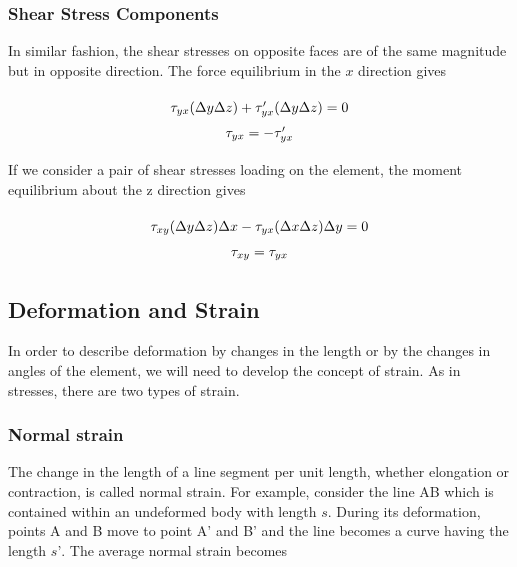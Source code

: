 \documentclass[
10pt,
a4paper,
openany,
svgnames,
]{book}
\begin{document}
\subsubsection{Shear Stress Components}

In similar fashion, the shear stresses on opposite faces are of the same magnitude but in opposite direction.
The force equilibrium in the $x$ direction gives

\begin{equation}
  \arraycolsep=1.4pt\def\arraystretch{1.5}
  \begin{array}{c}
    \tau _{yx}(\Delta y\Delta z) + \tau_{yx}'(\Delta y\Delta z) = 0\\
    \tau _{yx} =  - \tau_{yx}'
  \end{array}
\end{equation}

If we consider a pair of shear stresses loading on the element, the moment equilibrium about the z direction gives

\begin{equation}
  \arraycolsep=1.4pt\def\arraystretch{1.5}
  \begin{array}{c}
    \tau _{xy}(\Delta y\Delta z)\Delta x - \tau _{yx}(\Delta x\Delta z)\Delta y = 0\\
    \tau _{xy} = \tau _{yx}
  \end{array}
\end{equation}

\subsection{Deformation and Strain}

In order to describe deformation by changes in the length or by the changes in angles of the element, we will need to develop the concept of strain. As in stresses, there are two types of strain.

\subsubsection{Normal strain}

The change in the length of a line segment per unit length, whether elongation or contraction, is called normal strain. For example, consider the line AB which is contained within an undeformed body with length $s$. During its deformation, points A and B move to point A’ and B’ and the line becomes a curve having the length $s’$. The average normal strain becomes
\end{document}
